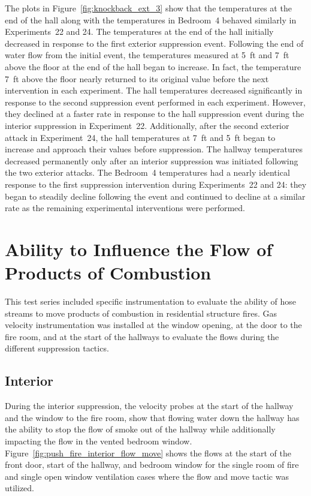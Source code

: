 \documentclass[12pt,oneside]{book}
\begin{document}
\FloatBarrier 

The plots in Figure~\ref{fig:knockback_ext_3} show that the temperatures at the end of the hall along with the temperatures in Bedroom~4 behaved similarly in Experiments~22 and 24. The temperatures at the end of the hall initially decreased in response to the first exterior suppression event. Following the end of water flow from the initial event, the temperatures measured at 5~ft and 7~ft above the floor at the end of the hall began to increase. In fact, the temperature 7~ft above the floor nearly returned to its original value before the next intervention in each experiment. The hall temperatures decreased significantly in response to the second suppression event performed in each experiment. However, they declined at a faster rate in response to the hall suppression event during the interior suppression in Experiment~22. Additionally, after the second exterior attack in Experiment~24, the hall temperatures at 7~ft and 5~ft began to increase and approach their values before suppression. The hallway temperatures decreased permanently only after an interior suppression was initiated following the two exterior attacks. The Bedroom~4 temperatures had a nearly identical response to the first suppression intervention during Experiments~22 and 24: they began to steadily decline following the event and continued to decline at a similar rate as the remaining experimental interventions were performed. 

\FloatBarrier

\section{Ability to Influence the Flow of Products of Combustion}
This test series included specific instrumentation to evaluate the ability of hose streams to move products of combustion in residential structure fires. Gas velocity instrumentation was installed at the window opening, at the door to the fire room, and at the start of the hallways to evaluate the flows during the different suppression tactics.

\subsection{Interior}
During the interior suppression, the velocity probes at the start of the hallway and the window to the fire room, show that flowing water down the hallway has the ability to stop the flow of smoke out of the hallway while additionally impacting the flow in the vented bedroom window. Figure~\ref{fig:push_fire_interior_flow_move} shows the flows at the start of the front door, start of the hallway, and bedroom window for the single room of fire and single open window ventilation cases where the flow and move tactic was utilized.   
\end{document}
